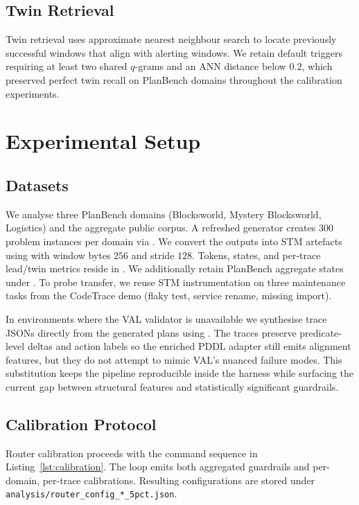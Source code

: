 \documentclass[11pt]{article}
\begin{document}
\subsection{Twin Retrieval}
Twin retrieval uses approximate nearest neighbour search to locate previously
successful windows that align with alerting windows. We retain default triggers
requiring at least two shared $q$-grams and an ANN distance below $0.2$, which
preserved perfect twin recall on PlanBench domains throughout the calibration
experiments.

\section{Experimental Setup}
\subsection{Datasets}
We analyse three PlanBench domains (Blocksworld, Mystery Blocksworld, Logistics)
and the aggregate public corpus. A refreshed generator creates 300 problem
instances per domain via . We
convert the outputs into STM artefacts using 
with window bytes $256$ and stride $128$. Tokens, states, and per-trace
lead/twin metrics reside in . We
additionally retain PlanBench aggregate states under .
To probe transfer, we reuse STM
instrumentation on three maintenance tasks from the CodeTrace demo (flaky test,
service rename, missing import).

In environments where the VAL validator is unavailable we synthesise trace JSONs
directly from the generated plans using .
The traces preserve predicate-level deltas and action labels so the enriched
PDDL adapter still emits alignment features, but they do not attempt to mimic
VAL's nuanced failure modes. This substitution keeps the pipeline reproducible
inside the harness while surfacing the current gap between structural features
and statistically significant guardrails.

\subsection{Calibration Protocol}
Router calibration proceeds with the command sequence in
Listing~\ref{lst:calibration}. The loop emits both aggregated guardrails and
per-domain, per-trace calibrations. Resulting configurations are stored under
\texttt{analysis/router\_config\_*\_5pct.json}.
\end{document}

